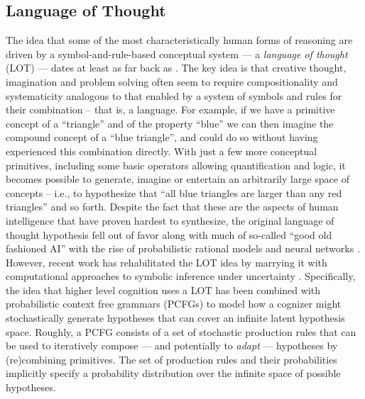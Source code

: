 \documentclass[doc,natbib,floatsintext]{apa7}
\begin{document}
\subsection{Language of Thought}
The idea that some of the most characteristically human forms of reasoning are driven by a symbol-and-rule-based conceptual system --- a \textit{language of thought} (LOT) --- dates at least as far back as \cite{fodor1975language}. The key idea is that creative thought, imagination and problem solving often seem to require compositionality and systematicity analogous to that enabled by a system of symbols and rules for their combination -- that is, a language. For example, if we have a primitive concept of a  ``triangle'' and of the property ``blue'' we can then imagine the compound concept of a ``blue triangle'', and could do so without having experienced this combination directly. With just a few more conceptual primitives, including some basic operators allowing quantification and logic, it becomes possible to generate, imagine or entertain an arbitrarily large space of concepts -- i.e., to hypothesize that ``all blue triangles are larger than any red triangles'' and so forth. Despite the fact that these are the aspects of human intelligence that have proven hardest to synthesize, the original language of thought hypothesis fell out of favor along with much of so-called ``good old fashioned AI'' with the rise of probabilistic rational models and neural networks \citep{chater1990autonomy}. However, recent work has rehabilitated the LOT idea by marrying it with computational approaches to symbolic inference under uncertainty \citep{piantadosi2016four, yang2022one}. Specifically, the idea that higher level cognition uses a LOT has been combined with probabilistic context free grammars (PCFGs) to model how a cognizer might stochastically generate hypotheses that can cover an infinite latent hypothesis space. Roughly, a PCFG consists of a set of stochastic production rules that can be used to iteratively compose --- and potentially to \textit{adapt} --- hypotheses by (re)combining primitives. The set of production rules and their probabilities implicitly specify a probability distribution over the infinite space of possible hypotheses.
\end{document}
